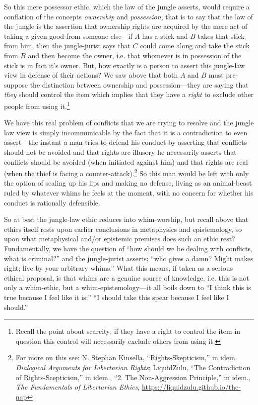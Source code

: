 \documentclass[11pt]{article}
\begin{document}
So this mere possessor ethic, which the law of the jungle asserts, would require a conflation of the concepts \emph{ownership} and \emph{possession}, that is to say that the law of the jungle is the assertion that ownership rights are acquired by the mere act of taking a given good from someone else---if \(A\) has a stick and \(B\) takes that stick from him, then the jungle-jurist says that \(C\) could come along and take the stick from \(B\) and then become the owner, i.e. that whomever is in possession of the stick is in fact it's owner. But, how exactly is a person to assert this jungle-law view in defense of their actions? We saw above that both \(A\) and \(B\) must pre-suppose the distinction between ownership and possession---they are saying that \emph{they} should control the item which implies that they have a \emph{right} to exclude other people from using it.\footnote{Recall the point about scarcity; if they have a right to control the item in question this control will necessarily exclude others from using it.}

We have this real problem of conflicts that we are trying to resolve and the jungle law view is simply incommunicable by the fact that it is a contradiction to even assert---the instant a man tries to defend his conduct by asserting that conflicts should not be avoided and that rights are illusory he necessarily asserts that conflicts should be avoided (when initiated against him) and that rights are real (when the thief is facing a counter-attack).\footnote{For more on this see: N. Stephan Kinsella, ``Rights-Skepticism,'' in idem. \emph{Dialogical Arguments for Libertarian Rights}; LiquidZulu, ``The Contradiction of Rights-Scepticism,'' in idem., ``2. The Non-Aggression Principle,'' in idem., \emph{The Fundamentals of Libertarian Ethics}, \url{https://liquidzulu.github.io/the-nap}} So this man would be left with only the option of sealing up his lips and making no defense, living as an animal-beast ruled by whatever whims he feels at the moment, with no concern for whether his conduct is rationally defensible.

So at best the jungle-law ethic reduces into whim-worship, but recall above that ethics itself rests upon earlier conclusions in metaphysics and epistemology, so upon what metaphysical and/or epistemic premises does such an ethic rest? Fundamentally, we have the question of ``how should we be dealing with conflicts, what is criminal?'' and the jungle-jurist asserts: ``who gives a damn? Might makes right; live by your arbitrary whims.'' What this means, if taken as a serious ethical proposal, is that whims are a genuine source of knowledge, i.e. this is not only a whim-ethic, but a whim-epistemology---it all boils down to ``I think this is true because I feel like it is;'' ``I should take this spear because I feel like I should.''
\end{document}

